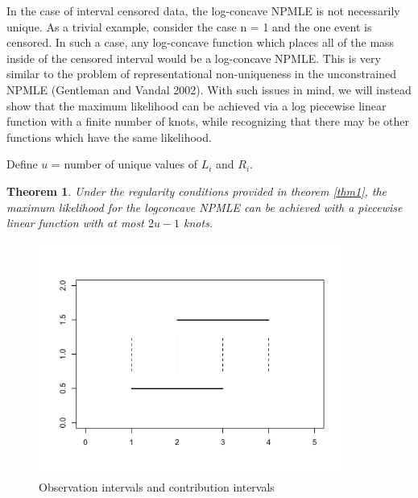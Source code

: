 \documentclass[10pt]{article}
\newtheorem{thm}{Theorem}
\begin{document}
	In the case of interval censored data, the log-concave NPMLE is not necessarily unique. As a trivial example, consider the case n = 1 and the one event is censored. In such a case, any log-concave function which places all of the mass inside of the censored interval would be a log-concave NPMLE. This is very similar to the problem of representational non-uniqueness in the unconstrained NPMLE (Gentleman and Vandal 2002). With such issues in mind, we will instead show that the maximum likelihood can be achieved via a log piecewise linear function with a finite number of knots, while recognizing that there may be other functions which have the same likelihood. 
	
	Define $u$ = number of unique values of $L_i$ and $R_i$. 

	\begin{thm}
	\label{thm2}
	Under the regularity conditions provided in theorem \ref{thm1}, the maximum likelihood for the logconcave NPMLE can be achieved with a piecewise linear function with at most $2u-1$ knots.
	\end{thm}
	
\begin{figure}[h]
\centerline{\includegraphics[width = 10cm]{ContrbInt.pdf} }
\caption{Observation intervals and contribution intervals}
\end{figure}	
\end{document}
